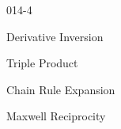\begin{mitframe}{014-4}

    
\begin{listone}
        
    \item Derivative Inversion
        
    \item Triple Product
         
    \item Chain Rule Expansion
    
    \item Maxwell Reciprocity
    
\end{listone}			

\end{mitframe}